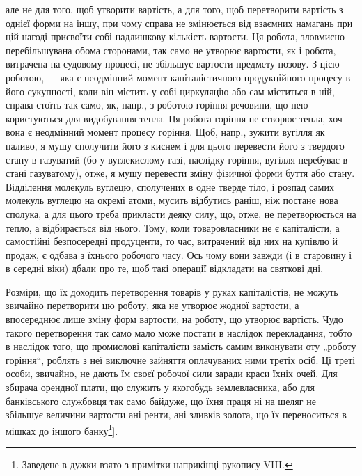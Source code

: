 \parcont{}  %
але не для того, щоб утворити вартість, а для того, щоб перетворити
вартість з однієї форми на іншу, при чому справа не змінюється від
взаємних намагань при цій нагоді присвоїти собі надлишкову кількість
вартости. Ця робота, зловмисно перебільшувана обома сторонами, так само не
утворює вартости, як і робота, витрачена на судовому процесі, не
збільшує вартости предмету позову. З цією роботою, — яка є неодмінний
момент капіталістичного продукційного процесу в його сукупності, коли
він містить у собі циркуляцію або сам міститься в ній, — справа стоїть
так само, як, напр., з роботою горіння речовини, що нею користуються для
видобування тепла. Ця робота горіння не створює тепла, хоч вона є
неодмінний момент процесу горіння. Щоб, напр., зужити вугілля як
паливо, я мушу сполучити його з киснем і для цього перевести його з
твердого стану в газуватий (бо у вуглекислому газі, наслідку горіння,
вугілля перебуває в стані газуватому), отже, я мушу перевести зміну
фізичної форми буття або стану. Відділення молекуль вуглецю, сполучених
в одне тверде тіло, і розпад самих молекуль вуглецю на окремі атоми,
мусить відбутись раніш, ніж постане нова сполука, а для цього треба
прикласти деяку силу, що, отже, не перетворюється на тепло, а
відбирається від нього. Тому, коли товаровласники не є капіталісти, а
самостійні безпосередні продуценти, то час, витрачений від них на купівлю
й продаж, є одбава з їхнього робочого часу. Ось чому вони завжди
(і в старовину і в середні віки) дбали про те, щоб такі операції відкладати
на святкові дні.

Розміри, що їх доходить перетворення товарів у руках капіталістів, не
можуть звичайно перетворити цю роботу, яка не утворює жодної вартости,
а впосереднює лише зміну форм вартости, на роботу, що утворює вартість.
Чудо такого перетворення так само мало може постати в наслідок
перекладання, тобто в наслідок того, що промислові капіталісти замість
самим виконувати оту „роботу горіння“, роблять з неї виключне зайняття
оплачуваних ними третіх осіб. Ці треті особи, звичайно, не дають їм
своєї робочої сили заради краси їхніх очей. Для збирача орендної плати,
що служить у якогобудь землевласника, або для банківського службовця
так само байдуже, що їхня праця ні на шеляг не збільшує величини
вартости ані ренти, ані зливків золота, що їх переноситься в мішках до
іншого банку\footnote{
Заведене в дужки взято з примітки наприкінці рукопису VIII.
}].

